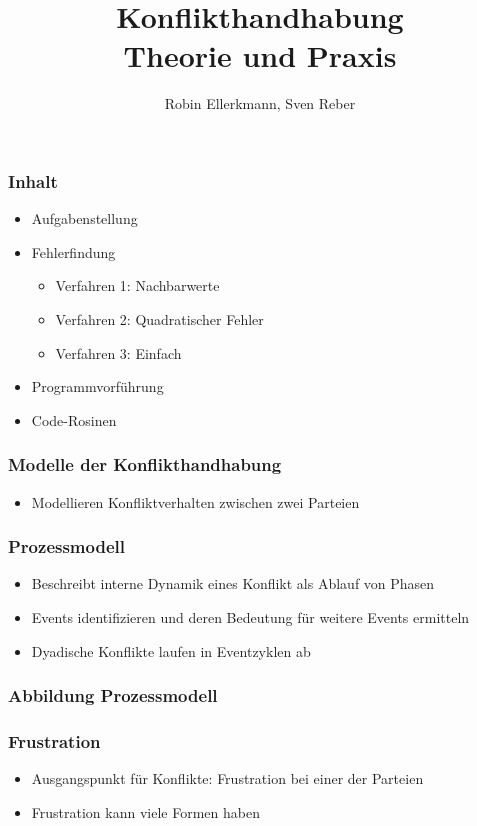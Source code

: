 \documentclass[12pt,a4paper]{beamer}
\author{Robin Ellerkmann, Sven Reber}
\title{Konflikthandhabung\\Theorie und Praxis}
\begin{document}
\maketitle

\begin{frame}
	\frametitle{Inhalt}
	
	\begin{itemize}
		\item Aufgabenstellung
		\item Fehlerfindung
		\begin{itemize}
			\item Verfahren 1: Nachbarwerte
			\item Verfahren 2: Quadratischer Fehler
			\item Verfahren 3: Einfach
		\end{itemize}
		\item Programmvorf\"uhrung
		\item Code-Rosinen
	\end{itemize}
\end{frame}

\begin{frame}
	\frametitle{Modelle der Konflikthandhabung}
	\begin{itemize}
		\item Modellieren Konfliktverhalten zwischen zwei Parteien
	\end{itemize}
\end{frame}

\begin{frame}
	\frametitle{Prozessmodell}
	\begin{itemize}
		\item Beschreibt interne Dynamik eines Konflikt als Ablauf von Phasen
		\item Events identifizieren und deren Bedeutung für weitere Events ermitteln
		\item Dyadische Konflikte laufen in Eventzyklen ab
	\end{itemize}
\end{frame}

\begin{frame}
	\frametitle{Abbildung Prozessmodell}
	\begin{itemize}
	\end{itemize}
\end{frame}

\begin{frame}
	\frametitle{Frustration}
	\begin{itemize}
		\item Ausgangspunkt für Konflikte: Frustration bei einer der Parteien
		\item Frustration kann viele Formen haben
	\end{itemize}
\end{frame}
\end{document}
